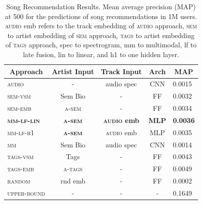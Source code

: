 \begin{table}[]
\centering
\begin{tabular}{lcccl}
\toprule
\multicolumn{1}{c}{\textbf{Approach}} & \textbf{Artist Input} & \textbf{Track Input} & \textbf{Arch} & \multicolumn{1}{c}{\textbf{MAP}} \\
\midrule
\textsc{audio}                                 & -                     & audio spec        & CNN           & 0.0015                          \\
\textsc{sem-vsm}                               & Sem Bio               & -                    & FF            & 0.0032                          \\
\textsc{sem-emb}                               & \textsc{a-sem}            & -                    & FF            & 0.0034                          \\
\midrule
\textsc{\textbf{mm-lf-lin}}                        & \textsc{\textbf{a-sem}}     & \textbf{\textsc{audio} emb}  & \textbf{MLP} & \textbf{0.0036}                  \\
\textsc{mm-lf-h1}                        & \textsc{\textbf{a-sem}}     & \textsc{audio} emb  & MLP & 0.0035                  \\
\textsc{mm}                                    & Sem Bio               & audio spec        & CNN            & 0.0014                          \\
\midrule
\textsc{tags-vsm}                              & Tags              & -                    & FF            & 0.0043                          \\
\textsc{tags-emb}                              & \textsc{a-tags}           & -                    & FF            & 0.0049                          \\
\midrule
\textsc{random}                                & rnd emb         & -                    & FF            & 0.0002                          \\
\textsc{upper-bound}                           & -                     & -                    & -             & 0.1649                   \\      
\bottomrule
\end{tabular}
\caption[Song Recommendation Results.]{Song Recommendation Results. Mean average precision (MAP) at 500 for the predictions of song recommendations in 1M users. \textsc{audio} emb refers to the track embedding of \textsc{audio} approach, \textsc{sem} to artist embedding of \textsc{sem} approach, \textsc{tags} to artist embedding of \textsc{tags} approach, spec to spectrogram, mm to multimodal, lf to late fusion, lin to linear, and h1 to one hidden layer.}
\label{tbl:cold-rec:song}
\end{table}

